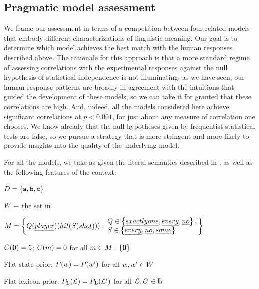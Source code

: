 \documentclass[leqno]{article}
\begin{document}

\subsection{Pragmatic model assessment}


We frame our assessment in terms of a competition between four related
models that embody different characterizations of linguistic meaning.
Our goal is to determine which model achieves the best match with the
human responses described above. The rationale for this approach is
that a more standard regime of assessing correlations with the
experimental responses against the null hypothesis of statistical
independence is not illuminating: as we have seen, our human response
patterns are broadly in agreement with the intuitions that guided the
development of these models, so we can take it for granted that these
correlations are high. And, indeed, all the models considered here
achieve significant correlations at $p < 0.001$, for just about any
measure of correlation one chooses.  We know already that the null
hypotheses given by frequentist statistical tests are false, so we
pursue a strategy that is more stringent and more likely to provide
insights into the quality of the underlying model.

For all the models, we take as given the literal semantics described
in , as well as the following features of the
context:
%
\begin{examples}
\item\label{expmod}
  \begin{examples}
  \item $D = \left\{ \texttt{a}, \texttt{b}, \texttt{c} \right\}$
  \item $W = $ the set in 
  \item\label{expformulae} $\Messages =
    \setlength{\arraycolsep}{2pt}
    \set{
      Q(\word{player})(\word{hit}(S(\word{shot}))) :
      \begin{array}{l}        
        Q \in \set{\word{exactly one}, \word{every}, \word{no}}, \\
        S \in \set{\word{every}, \word{no}, \word{some}}
      \end{array}}$
  \item $C(\mathbf{0}) = 5$; $C(m) = 0$ for all $m \in M{-}\left\{ \mathbf{0} \right\}$  
  \item Flat state prior: $P(w) = P(w')$ for all $w, w' \in W$
  \item Flat lexicon prior: $P_{\mathbf{L}}(\mathcal{L}) = P_{\mathbf{L}}(\mathcal{L}')$ for all $\mathcal{L}, \mathcal{L}' \in \mathbf{L}$
  \end{examples}
\end{examples}
\end{document}
